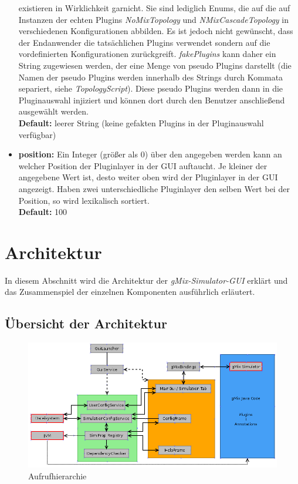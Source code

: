 \documentclass[a4paper, 11pt]{article} %
\begin{document}
\begin{itemize}
	existieren in Wirklichkeit garnicht. Sie sind lediglich Enums, die auf die auf Instanzen der echten Plugins \emph{NoMixTopology} und \emph{NMixCascadeTopology} in verschiedenen Konfigurationen abbilden. Es ist jedoch nicht gewünscht, dass der Endanwender die tatsächlichen Plugins verwendet sondern auf die vordefinierten Konfigurationen zurückgreift. \emph{fakePlugins} kann daher ein String zugewiesen werden, der eine Menge von pseudo Plugins darstellt (die Namen der pseudo Plugins werden innerhalb des Strings durch Kommata separiert, siehe \emph{TopologyScript}). Diese pseudo Plugins werden dann in die Pluginauswahl injiziert und können dort durch den Benutzer anschließend ausgewählt werden.\\
	\textbf{Default:} leerer String (keine gefakten Plugins in der Pluginauswahl verfügbar)
	\item \textbf{position:}
	Ein Integer (größer als 0) über den angegeben werden kann an welcher Position der Pluginlayer in der GUI auftaucht. Je kleiner der angegebene Wert ist, desto weiter oben wird der Pluginlayer in der GUI angezeigt. Haben zwei unterschiedliche Pluginlayer den selben Wert bei der Position, so wird lexikalisch sortiert.\\
	\textbf{Default:} 100 
\end{itemize}

\section{Architektur} %
\label{sec:architektur}
In diesem Abschnitt wird die Architektur der \emph{gMix-Simulator-GUI} erklärt und das Zusammenspiel der einzelnen Komponenten ausführlich erläutert. 

\subsection{Übersicht der Architektur} %
\label{ssub:uebersicht}

\begin{figure}[!htp]
\includegraphics[width=\textwidth]{img/arch.png}
\caption{Aufrufhierarchie}
\label{fig:callgraph}
\end{figure}
\end{document}
